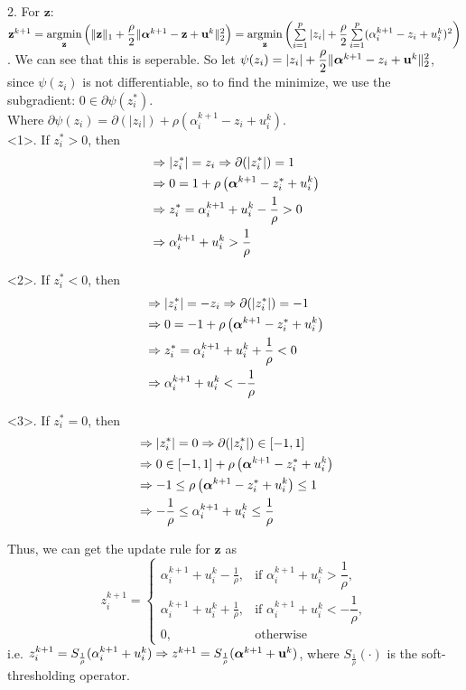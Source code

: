 2. For $\mathbf{z}$: $\mathbf{z}^{k+1} = \mathop{\rm argmin}\limits_{\mathbf{z}} \left(\|\mathbf{z}\|_1 + \dfrac{\rho}{2}\|\boldsymbol{\alpha}^{k+1} - \mathbf{z} + \mathbf{u}^k\|_2^2\right) = \mathop{\rm argmin}\limits_{\mathbf{z}} \left(\sum\limits_{i=1}^p|z_i| + \dfrac{\rho}{2}\sum\limits_{i=1}^p(\alpha_i^{k+1} - z_i + u_i^k)^2\right)$. We can see that this is seperable. So let $\psi(z_i) = |z_i| + \dfrac{\rho}{2}\|\boldsymbol{\alpha}^{k+1} - z_i + \mathbf{u}^k\|_2^2$, since $\psi(z_i)$ is not differentiable, so to find the minimize, we use the subgradient: $0\in \partial\psi(z_i^*)$. \\
Where $\partial\psi(z_i)=\partial(|z_i|)+\rho\left(\alpha_i^{k+1} - z_i + u_i^k\right)$. \\
<1>. If $z_i^*>0$, then
\begin{align*}
&\Rightarrow |z_i^*|=z_i \Rightarrow \partial(|z_i^*|)=1 \\
&\Rightarrow 0 = 1 + \rho\left(\boldsymbol{\alpha}^{k+1} - z_i^* + u_i^k\right) \\
&\Rightarrow z_i^* = \alpha_i^{k+1} + u_i^k - \dfrac{1}{\rho} > 0 \\
&\Rightarrow \alpha_i^{k+1} + u_i^k > \dfrac{1}{\rho}
\end{align*}

<2>. If $z_i^*<0$, then
\begin{align*}
&\Rightarrow |z_i^*|=-z_i \Rightarrow \partial(|z_i^*|)=-1 \\
&\Rightarrow 0 = -1 + \rho\left(\boldsymbol{\alpha}^{k+1} - z_i^* + u_i^k\right) \\
&\Rightarrow z_i^* = \alpha_i^{k+1} + u_i^k + \dfrac{1}{\rho} < 0 \\
&\Rightarrow \alpha_i^{k+1} + u_i^k < -\dfrac{1}{\rho}
\end{align*}

<3>. If $z_i^*=0$, then
\begin{align*}
&\Rightarrow |z_i^*|=0 \Rightarrow \partial(|z_i^*|) \in [-1,1] \\
&\Rightarrow 0 \in [-1,1] + \rho\left(\boldsymbol{\alpha}^{k+1} - z_i^* + u_i^k\right) \\
&\Rightarrow -1 \leq \rho\left(\boldsymbol{\alpha}^{k+1} - z_i^* + u_i^k\right) \leq 1 \\
&\Rightarrow -\dfrac{1}{\rho} \leq \alpha_i^{k+1} + u_i^k \leq \dfrac{1}{\rho}
\end{align*}

Thus, we can get the update rule for $\mathbf{z}$ as
$$z_i^{k+1} = \begin{cases}
\alpha_i^{k+1} + u_i^k - \frac{1}{\rho}, & \text{if } \alpha_i^{k+1} + u_i^k > \dfrac{1}{\rho}, \\
\alpha_i^{k+1} + u_i^k + \frac{1}{\rho}, & \text{if } \alpha_i^{k+1} + u_i^k < -\dfrac{1}{\rho}, \\
0, & \text{otherwise}
\end{cases}$$
i.e. $z_i^{k+1} = S_{\frac{1}{\rho}}(\alpha_i^{k+1} + u_i^k) \Rightarrow z^{k+1} = S_{\frac{1}{\rho}}(\boldsymbol{\alpha}^{k+1} + \mathbf{u}^k)$, where $S_{\frac{1}{\rho}}(\cdot)$ is the soft-thresholding operator.

